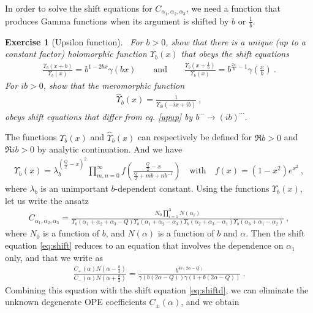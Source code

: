 \documentclass[12pt, a4paper]{article}
\theoremstyle{break}
\newtheorem{exo}{Exercise}[section]
\begin{document}
In order to solve the shift equations for $C_{\alpha_1,\alpha_2,\alpha_3}$, we need a function that produces Gamma functions when its argument is shifted by $b$ or $\frac{1}{b}$. 

\begin{exo}[Upsilon function]
~\label{exo:upsilon}
 For $b>0$, show that there is a unique (up to a constant factor) holomorphic function $\Upsilon_b(x)$ that obeys the shift equations
 \begin{align}
  \frac{\Upsilon_b(x+b)}{\Upsilon_b(x)} = b^{1-2bx} \gamma(bx)\qquad \text{and} \qquad \frac{\Upsilon_b(x+\frac{1}{b})}{\Upsilon_b(x)} = b^{\frac{2x}{b}-1} \gamma(\tfrac{x}{b})\ .
\label{upup}
\end{align}
For $ib>0$, show that the meromorphic function 
\begin{align}
 \hat{\Upsilon}_b(x) = \frac{1}{\Upsilon_{ib}(-ix+ib)}\ ,
\end{align}
obeys shift equations that differ from eq. \eqref{upup} by $b^{\cdots} \to (ib)^{\cdots}$.
\end{exo}
The functions $\Upsilon_b(x)$ and $\hat\Upsilon_b(x)$ can respectively be defined for $\Re b>0$ and $\Re ib>0$ by analytic continuation. And we have 
\begin{align}
 \Upsilon_b(x) = \lambda_b^{(\frac{Q}{2}-x)^2}\prod_{m,n=0}^\infty f\left(\frac{\frac{Q}{2}-x}{\frac{Q}{2}+mb+nb^{-1}}\right) \quad \text{with} \quad f(x)=(1-x^2)e^{x^2}\ ,
\end{align}
where $\lambda_b$ is an unimportant $b$-dependent constant.
Using the functions $\Upsilon_b(x)$, let us write the ansatz
\begin{align}
 C_{\alpha_1,\alpha_2,\alpha_3} =  \frac{N_0 \prod_{i=1}^3 N(\alpha_i)}{\Upsilon_b(\alpha_1+\alpha_2+\alpha_3-Q) \Upsilon_b(\alpha_1+\alpha_2-\alpha_3)\Upsilon_b(\alpha_2+\alpha_3-\alpha_1)\Upsilon_b(\alpha_3+\alpha_1-\alpha_2)} \ ,
\end{align}
where $N_0$ is a function of $b$, and $N(\alpha)$ is a function of $b$ and $\alpha$. 
Then the shift equation \eqref{eq:shift} reduces to an equation that involves the dependence on $\alpha_1$ only, and that we write as
\begin{align}
 \frac{C_+(\alpha)N(\alpha-\frac{b}{2})}{C_-(\alpha)N(\alpha+\frac{b}{2})} = \frac{b^{4b(2\alpha-Q)}}{ \gamma(b(2\alpha-Q)) \gamma(1+b(2\alpha-Q))}\ .
\end{align}
Combining this equation with the shift equation \eqref{eq:shiftd}, we can eliminate the unknown degenerate OPE coefficients $C_\pm(\alpha)$, and we obtain
\end{document}
